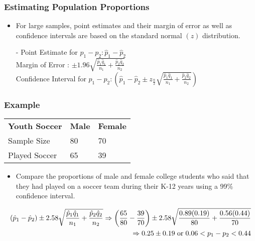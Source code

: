\documentclass[12pt, letterpaper]{article}
\begin{document}
            \subsubsection{Estimating Population Proportions}
                \begin{itemize}
                    \item For large samples, point estimates and their margin of error as well as confidence intervals are based on the standard normal $(z)$ distribution.
                    \item[-] Point Estimate for $p_1-p_2 : \hat{p}_1-\hat{p}_2$ \\ Margin of Error : $\pm 1.96\sqrt{\frac{\hat{p}_1\hat{q}_1}{n_1} + \frac{\hat{p}_2\hat{q}_2}{n_2}}$ \\ Confidence Interval for $p_1-p_2 : (\hat{p}_1-\hat{p}_2\pm z_{\frac{\alpha}{2}}\sqrt{\frac{\hat{p}_1\hat{q}_1}{n_1} + \frac{\hat{p}_2\hat{q}_2}{n_2}})$
                \end{itemize}
            \newpage\subsubsection*{Example}
                \begin{tabular}{|l|l|l|}
                    \cline{1-3}
                    \textbf{Youth Soccer} & \textbf{Male} & \textbf{Female} \\ \cline{1-3}
                    Sample Size & 80 & 70 \\ \cline{1-3}
                    Played Soccer & 65 & 39 \\ \cline{1-3}
                \end{tabular}
                \begin{itemize}
                    \item Compare the proportions of male and female college students who said that they had played on a soccer team during their K-12 years using a 99\% confidence interval.
                \end{itemize}
                \begin{mdframed}[leftmargin=0.5cm, rightmargin=0.5cm]
                    \begin{align*}
                        (\hat{p}_1 - \hat{p}_2)\pm 2.58\sqrt{\frac{\hat{p}_1\hat{q}_1}{n_1} + \frac{\hat{p}_2\hat{q}_2}{n_2}} \Rightarrow \left(\frac{65}{80} - \frac{39}{70} \right) \pm 2.58\sqrt{\frac{0.89(0.19)}{80} + \frac{0.56(0.44)}{70}} \\ \Rightarrow 0.25\pm 0.19 \hspace{3pt} \textnormal{or} \hspace{3pt} 0.06 < p_1 - p_2 < 0.44                    
                    \end{align*}
                \end{mdframed}
\end{document}
